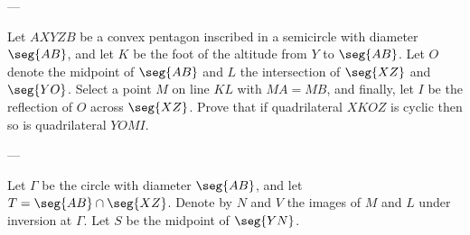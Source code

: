 
---

Let $AXYZB$ be a convex pentagon inscribed in a semicircle with diameter $\seg{AB}$, and let $K$ be the foot of the altitude from $Y$ to $\seg{AB}$. Let $O$ denote the midpoint of $\seg{AB}$ and $L$ the intersection of $\seg{XZ}$ and $\seg{YO}$. Select a point $M$ on line $KL$ with $MA=MB$, and finally, let $I$ be the reflection of $O$ across $\seg{XZ}$. Prove that if quadrilateral $XKOZ$ is cyclic then so is quadrilateral $YOMI$.

---

Let $\Gamma$ be the circle with diameter $\seg{AB}$, and let $T=\seg{AB}\cap\seg{XZ}$. Denote by $N$ and $V$ the images of $M$ and $L$ under inversion at $\Gamma$. Let $S$ be the midpoint of $\seg{YN}$.

